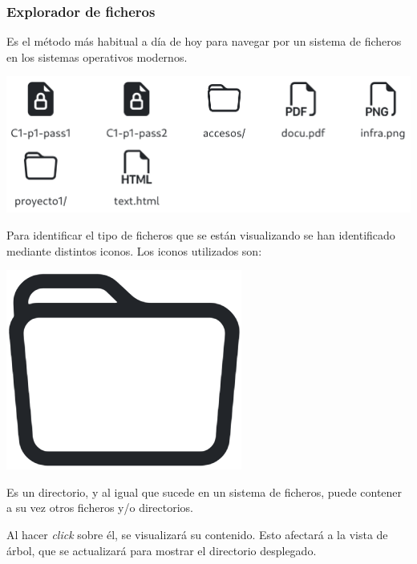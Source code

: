 \documentclass{\ClassPath/viu-tfm-template}
\begin{document}
\subsubsection*{Explorador de ficheros}

Es el método más habitual a día de hoy para navegar por un sistema de ficheros en los sistemas operativos modernos.

\begin{center}
    \includegraphics[width=0.9\linewidth]{img/browser.png}
\end{center}

Para identificar el tipo de ficheros que se están visualizando se han identificado mediante distintos iconos. Los iconos utilizados son:

{
\begin{minipage}{0.1\linewidth}
    \includegraphics[width=\linewidth]{img/folder.png}
\end{minipage}
\hspace{0.5cm}
\begin{minipage}{0.9\linewidth}
    Es un directorio, y al igual que sucede en un sistema de ficheros, puede contener a su vez otros ficheros y/o directorios.

    Al hacer \textit{click} sobre él, se visualizará su contenido. Esto afectará a la vista de árbol, que se actualizará para mostrar el directorio desplegado.
\end{minipage}
}
\end{document}
